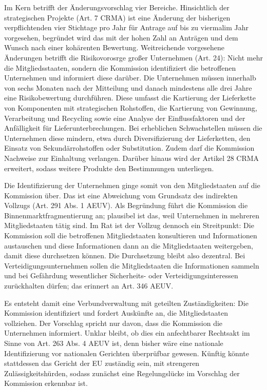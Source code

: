 \documentclass[12pt,a4paper,oneside]{book} %
\begin{document}
Im Kern betrifft der Änderungsvorschlag vier Bereiche. Hinsichtlich der strategischen Projekte (Art. 7 CRMA) ist eine Änderung der bisherigen verpflichtenden vier Stichtage pro Jahr für Antrage auf \glqq bis zu viermal\grqq im Jahr vorgesehen, begründet wird das mit der hohen Zahl an Anträgen und dem Wunsch nach einer kohärenten Bewertung. Weitreichende vorgesehene Änderungen betrifft die Risikovorosrge großer Unternehmen (Art. 24): Nicht mehr die Mitgliedsstaaten, sondern die Kommission identifiziert die betroffenen Unternehmen und informiert diese darüber. Die Unternehmen müssen innerhalb von sechs Monaten nach der Mitteilung und danach mindestens alle drei Jahre eine Risikobewertung durchführen. Diese umfasst die Kartierung der Lieferkette von Komponenten mit strategischen Rohstoffen, die Kartierung von Gewinnung, Verarbeitung und Recycling sowie eine Analyse der Einflussfaktoren und der Anfälligkeit für Lieferunterbrechungen. Bei erheblichen Schwachstellen müssen die Unternehmen diese mindern, etwa durch Diversifizierung der Lieferketten, den Einsatz von Sekundärrohstoffen oder Substitution. Zudem darf die Kommission Nachweise zur Einhaltung verlangen. Darüber hinaus wird der Artikel 28 CRMA erweitert, sodass weitere Produkte den Bestimmungen unterliegen.

Die Identifizierung der Unternehmen ginge somit von den Mitgliedstaaten auf die Kommission über. Das ist eine Abweichung vom Grundsatz des indirekten Vollzugs (Art. 291 Abs. 1 AEUV). Als Begründung führt die Kommission die Binnenmarktfragmentierung an; plausibel ist das, weil Unternehmen in mehreren Mitgliedstaaten tätig sind. Im Rat ist der Vollzug dennoch ein Streitpunkt: Die Kommission soll die betroffenen Mitgliedstaaten konsultieren und Informationen austauschen und diese Informationen dann an die Mitgliedstaaten weitergeben, damit diese durchsetzen können. Die Durchsetzung bleibt also dezentral. Bei Verteidigungsunternehmen sollen die Mitgliedstaaten die Informationen sammeln und bei Gefährdung wesentlicher Sicherheits- oder Verteidigungsinteressen zurückhalten dürfen; das erinnert an Art. 346 AEUV. 

Es entsteht damit eine Verbundverwaltung mit geteilten Zuständigkeiten: Die Kommission identifiziert und fordert Auskünfte an, die Mitgliedstaaten vollziehen. Der Vorschlag spricht nur davon, dass die Kommission die Unternehmen \glqq informiert\grqq. Unklar bleibt, ob dies ein anfechtbarer Rechtsakt im Sinne von Art. 263 Abs. 4 AEUV ist, denn bisher wäre eine nationale Identifizierung vor nationalen Gerichten überprüfbar gewesen. Künftig könnte stattdessen das Gericht der EU zuständig sein, mit strengeren Zulässigkeitshürden, sodass zunächst eine Regelungslücke im Vorschlag der Kommission erkennbar ist. 
\end{document}
